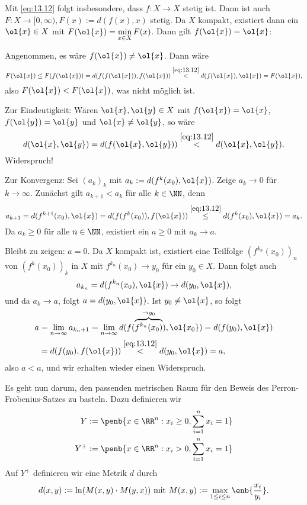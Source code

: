 \begin{beweis}
	Mit \eqref{eq:13.12} folgt insbesondere, dass $f \colon X \rightarrow X$ stetig ist.
	Dann ist auch $F\colon X \rightarrow [0,\infty), F(x) := d(f(x),x)$ stetig.
	Da $X$ kompakt, existiert dann ein $\ol{x} \in X$ mit $F(\ol{x}) = \min\limits_{x \in X} F(x)$.
	Dann gilt $f(\ol{x})= \ol{x}$:
	
	Angenommen, es wäre $f(\ol{x}) \neq \ol{x}$.
	Dann wäre
	\[
		F(\ol{x}) \leq F(f(\ol{x})) = d(f(f(\ol{x})),f(\ol{x})) \stackrel{\eqref{eq:13.12}}{<} d(f(\ol{x}),\ol{x}) = F(\ol{x}),
	\]
	also $F(\ol{x}) < F(\ol{x})$, was nicht möglich ist.
	
	Zur Eindeutigkeit: Wären $\ol{x}, \ol{y} \in X$ mit $f(\ol{x})=\ol{x}$, $f(\ol{y}) = \ol{y}$ und $\ol{x} \neq \ol{y}$, so wäre
	\[
		d(\ol{x},\ol{y}) = d(f(\ol{x},\ol{y})) \stackrel{\eqref{eq:13.12}}{<} d(\ol{x},\ol{y}).
	\]
	Widerspruch!
	
	Zur Konvergenz: Sei $(a_k)_k$ mit $a_k := d(f^k(x_0),\ol{x})$.
	Zeige $a_k \rightarrow 0$ für $k \rightarrow \infty$.
	Zunächst gilt $a_{k+1} < a_k$ für alle $k \in \NN$, denn
	\[
		a_{k+1} = d(f^{k+1}(x_0),\ol{x}) = d(f(f^k(x_0)),f(\ol{x})) \stackrel{\eqref{eq:13.12}}{\leq} d(f^k(x_0),\ol{x}) = a_k.
	\]
	Da $a_k \geq 0$ für alle $n \in \NN$, existiert ein $a \geq 0$ mit $a_k \rightarrow a$.
	
	Bleibt zu zeigen: $a = 0$.
	Da $X$ kompakt ist, existiert eine Teilfolge $(f^{k_n}(x_0))_n$ von $(f^k(x_0))_k$ in $X$ mit $f^{k_n}(x_0) \rightarrow y_0$ für ein $y_0 \in X$.
	Dann folgt auch
	\[
		a_{k_n} = d(f^{k_n}(x_0),\ol{x}) \rightarrow d(y_0,\ol{x}),
	\]
	und da $a_k \rightarrow a$, folgt $a = d(y_0,\ol{x})$.
	Ist $y_0 \neq \ol{x}$, so folgt
	\begin{align*}
		a &= \lim\limits_{n \rightarrow \infty} a_{k_n+1} = \lim\limits_{n \rightarrow \infty} d(f(\overbrace{f^{k_n}(x_0)}^{\rightarrow y_0}),\ol{x_0}) = d(f(y_0),\ol{x}) \\
		&= d(f(y_0),f(\ol{x})) \stackrel{\eqref{eq:13.12}}{<} d(y_0,\ol{x}) = a,
	\end{align*}
	also $a < a$, und wir erhalten wieder einen Widerspruch. 
\end{beweis}

Es geht nun darum, den passenden metrischen Raum für den Beweis des Perron-Frobenius-Satzes zu basteln.
Dazu definieren wir
\begin{align*}
	Y &:= \penb{x \in \RR^n : x_i \geq 0, \sum_{i=1}^{n} x_i = 1} \\
	Y^+ &:= \penb{x \in \RR^n : x_i > 0, \sum_{i=1}^{n} x_i = 1}
\end{align*}
Auf $Y^+$ definieren wir eine Metrik $d$ durch
\begin{equation}
	d(x,y) := \ln(M(x,y) \cdot M(y,x)) \text{ mit } M(x,y) := \max_{1 \leq i \leq n} \enb{\frac{x_i}{y_i}}. \label{eq:13.D}
\end{equation}

